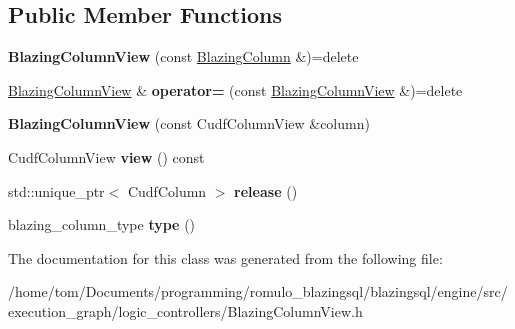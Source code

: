 \subsection*{Public Member Functions}
\begin{DoxyCompactItemize}
\item 
\mbox{\label{classral_1_1frame_1_1BlazingColumnView_a6614bc3303e9ddae2ca82b5f683db1e5}} 
{\bfseries Blazing\+Column\+View} (const \hyperlink{classral_1_1frame_1_1BlazingColumn}{Blazing\+Column} \&)=delete
\item 
\mbox{\label{classral_1_1frame_1_1BlazingColumnView_ac1364ad89ec54cbbc9519586e8c79025}} 
\hyperlink{classral_1_1frame_1_1BlazingColumnView}{Blazing\+Column\+View} \& {\bfseries operator=} (const \hyperlink{classral_1_1frame_1_1BlazingColumnView}{Blazing\+Column\+View} \&)=delete
\item 
\mbox{\label{classral_1_1frame_1_1BlazingColumnView_aaf2c734c09c9598cb033fb16e75b6084}} 
{\bfseries Blazing\+Column\+View} (const Cudf\+Column\+View \&column)
\item 
\mbox{\label{classral_1_1frame_1_1BlazingColumnView_ae4efd39e2da5a7b12ddc757e75612f57}} 
Cudf\+Column\+View {\bfseries view} () const
\item 
\mbox{\label{classral_1_1frame_1_1BlazingColumnView_ae6777c3e3e891ba83211a3313da79564}} 
std\+::unique\+\_\+ptr$<$ Cudf\+Column $>$ {\bfseries release} ()
\item 
\mbox{\label{classral_1_1frame_1_1BlazingColumnView_a15b97df0965af74f65b4f896b97ae980}} 
blazing\+\_\+column\+\_\+type {\bfseries type} ()
\end{DoxyCompactItemize}


The documentation for this class was generated from the following file\+:\begin{DoxyCompactItemize}
\item 
/home/tom/\+Documents/programming/romulo\+\_\+blazingsql/blazingsql/engine/src/execution\+\_\+graph/logic\+\_\+controllers/Blazing\+Column\+View.\+h\end{DoxyCompactItemize}
